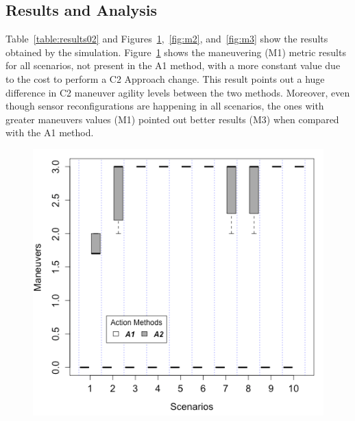\subsection{Results and Analysis}

Table~\ref{table:results02} and Figures~\ref{fig:m1},~\ref{fig:m2}, and~\ref{fig:m3} show the results obtained by the simulation. Figure~\ref{fig:m1} shows the maneuvering (M1) metric results for all scenarios, not present in the A1 method, with a more constant value due to the cost to perform a C2 Approach change. This result points out a huge difference in C2 maneuver agility levels between the two methods. Moreover, even though sensor reconfigurations are happening in all scenarios, the ones with greater maneuvers values (M1) pointed out better results (M3) when compared with the A1 method.

\begin{figure}[ht]
\centering
\begin{minipage}{.5\textwidth}
    \centering
    \small
    \fontsize{7}{7}\selectfont
    \label{table:results02}
    
\end{minipage}%
\begin{minipage}{.5\textwidth}
  \centering
  \includegraphics[width=0.95\linewidth]{figures/graphs/Boxplot_M2.png}
  \label{fig:m1}
\end{minipage}
\end{figure}

